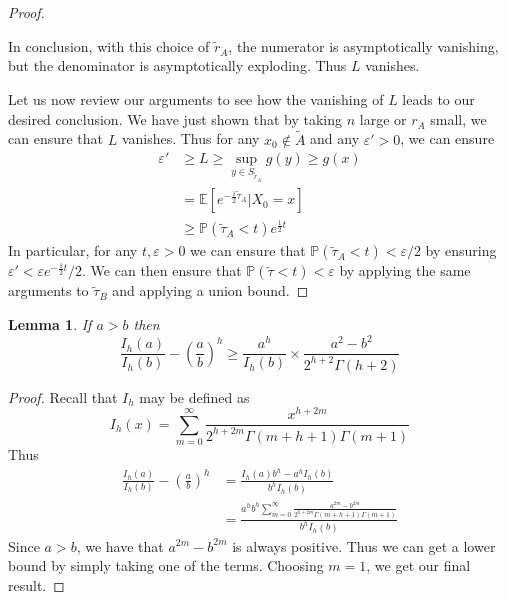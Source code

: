 \documentclass[nofootinbib,english, aip, jcp, priprint, graphicx,floatfix]{revtex4-1}
\newtheorem{lemma}{Lemma}
\theoremstyle{plain}
\theoremstyle{definition}
\theoremstyle{plain}
\begin{document}
\begin{proof}
\begin{itemize}
    In conclusion, with this choice of $\tilde r_{\dot A}$, the numerator is asymptotically vanishing, but the denominator is asymptotically exploding.  Thus $L$ vanishes.
\end{itemize}

Let us now review our arguments to see how the vanishing of $L$ leads to our desired conclusion.  We have just shown that by taking $n$ large or $r_{\dot A}$ small, we can ensure that $L$ vanishes.  Thus for any $x_0\notin \tilde A$ and any $\varepsilon'>0$, we can ensure
\begin{align*}
\varepsilon' & \geq L \geq \sup_{y \in S_{\tilde r_{\dot A}}} g(y) \geq g(x) \\
            & = \mathbb{E}[e^{-\frac{1}{2}\tilde \tau_A}|X_0=x]\\
            & \geq \mathbb{P}(\tilde \tau_A < t) e^{\frac{1}{2} t}
\end{align*}
In particular, for any $t,\varepsilon>0$ we can ensure that $\mathbb{P}(\tilde \tau_A < t)<\varepsilon/2$ by ensuring $\varepsilon' < \varepsilon e^{-\frac{1}{2} t}/2$.  We can then ensure that $\mathbb{P}(\tilde \tau < t)<\varepsilon$ by applying the same arguments to $\tilde \tau_B$ and applying a union bound.

\end{proof}

\begin{lemma}\label{lem:bessel}
If $a>b$ then
    \[
    \frac{I_h ( a)}{I_h (b)} - \left(\frac{a}{b} \right)^h 
    \geq
    \frac{a^h}{I_h(b)}\times\frac{a^{2} -b^{2}}{2^{h+2}\Gamma(h+2)}
    \]
\end{lemma}
\begin{proof}
Recall that $I_h$ may be defined as 
\[
I_h(x) = \sum_{m=0}^\infty \frac{x^{h+2m}}{2^{h+2m}\Gamma(m+h+1)\Gamma(m+1)}
\]
Thus
\begin{align*}
\frac{I_h ( a)}{I_h (b)} - \left(\frac{a}{b} \right)^h 
    &= \frac{I_h(a)b^h-a^hI_h(b)}{b^hI_h(b)}  \\
    &= \frac{a^hb^h\sum_{m=0}^\infty \frac{a^{2m} -b^{2m}}{2^{h+2m}\Gamma(m+h+1)\Gamma(m+1)}}{b^{h}I_h(b)}
\end{align*}
Since $a>b$, we have that $a^{2m} -b^{2m}$ is always positive.  Thus we can get a lower bound by simply taking one of the terms.  Choosing $m=1$, we get our final result.
\end{proof}

                                                            
\end{document}
